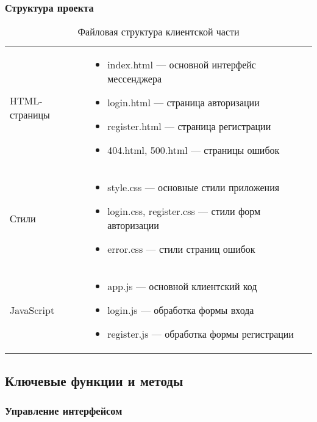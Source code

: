 \subsubsection{Структура проекта}
\begin{xltabular}{\textwidth}{|l|X|}
	\caption{Файловая структура клиентской части}\label{tab:project-structure} \\ \hline
	 &  \\ \hline 
	\endfirsthead
	\finishhead
	HTML-страницы & 
	\begin{itemize}[leftmargin=*,nosep]
		\item index.html — основной интерфейс мессенджера
		\item login.html — страница авторизации
		\item register.html — страница регистрации
		\item 404.html, 500.html — страницы ошибок
	\end{itemize} \\ \hline
	
	Стили & 
	\begin{itemize}[leftmargin=*,nosep]
		\item style.css — основные стили приложения
		\item login.css, register.css — стили форм авторизации
		\item error.css — стили страниц ошибок
	\end{itemize} \\ \hline
	
	JavaScript & 
	\begin{itemize}[leftmargin=*,nosep]
		\item app.js — основной клиентский код 
		\item login.js — обработка формы входа
		\item register.js — обработка формы регистрации
	\end{itemize} \\ \hline
	
\end{xltabular}

\subsection{Ключевые функции и методы}

\subsubsection{Управление интерфейсом}

